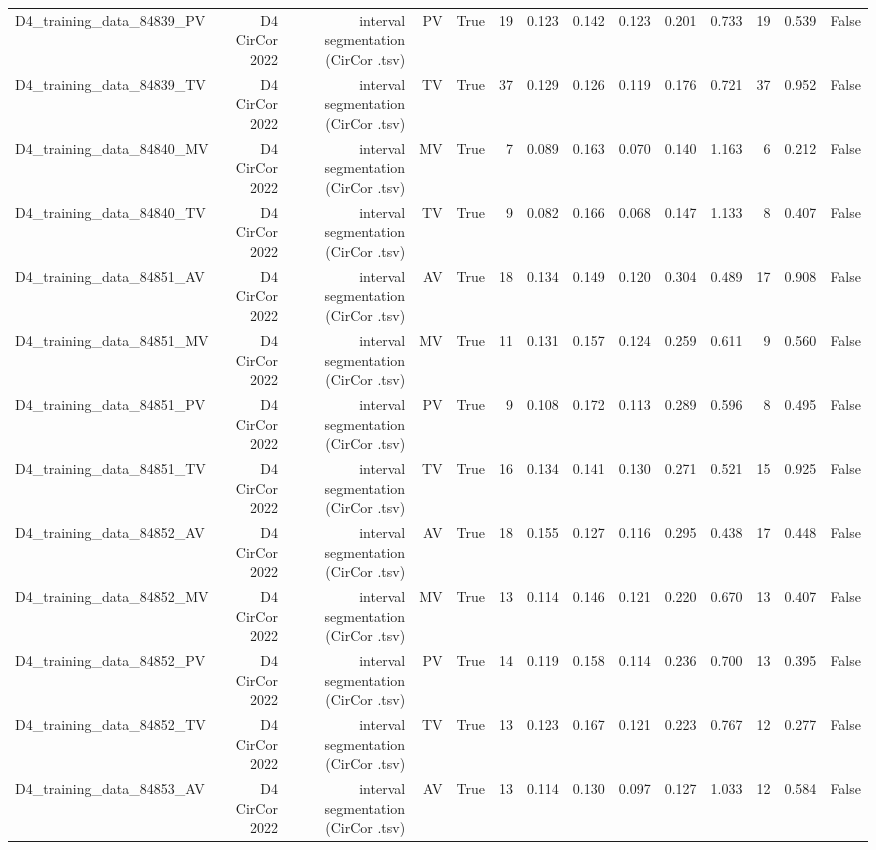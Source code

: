 \begin{table}[htbp]
\begin{tabular}{lrrrrrrrrrrrrr}
    D4\_training\_data\_84839\_PV & D4 CirCor 2022 & interval segmentation (CirCor .tsv) & PV & True & 19 & 0.123 & 0.142 & 0.123 & 0.201 & 0.733 & 19 & 0.539 & False \\
    D4\_training\_data\_84839\_TV & D4 CirCor 2022 & interval segmentation (CirCor .tsv) & TV & True & 37 & 0.129 & 0.126 & 0.119 & 0.176 & 0.721 & 37 & 0.952 & False \\
    D4\_training\_data\_84840\_MV & D4 CirCor 2022 & interval segmentation (CirCor .tsv) & MV & True & 7 & 0.089 & 0.163 & 0.070 & 0.140 & 1.163 & 6 & 0.212 & False \\
    D4\_training\_data\_84840\_TV & D4 CirCor 2022 & interval segmentation (CirCor .tsv) & TV & True & 9 & 0.082 & 0.166 & 0.068 & 0.147 & 1.133 & 8 & 0.407 & False \\
    D4\_training\_data\_84851\_AV & D4 CirCor 2022 & interval segmentation (CirCor .tsv) & AV & True & 18 & 0.134 & 0.149 & 0.120 & 0.304 & 0.489 & 17 & 0.908 & False \\
    D4\_training\_data\_84851\_MV & D4 CirCor 2022 & interval segmentation (CirCor .tsv) & MV & True & 11 & 0.131 & 0.157 & 0.124 & 0.259 & 0.611 & 9 & 0.560 & False \\
    D4\_training\_data\_84851\_PV & D4 CirCor 2022 & interval segmentation (CirCor .tsv) & PV & True & 9 & 0.108 & 0.172 & 0.113 & 0.289 & 0.596 & 8 & 0.495 & False \\
    D4\_training\_data\_84851\_TV & D4 CirCor 2022 & interval segmentation (CirCor .tsv) & TV & True & 16 & 0.134 & 0.141 & 0.130 & 0.271 & 0.521 & 15 & 0.925 & False \\
    D4\_training\_data\_84852\_AV & D4 CirCor 2022 & interval segmentation (CirCor .tsv) & AV & True & 18 & 0.155 & 0.127 & 0.116 & 0.295 & 0.438 & 17 & 0.448 & False \\
    D4\_training\_data\_84852\_MV & D4 CirCor 2022 & interval segmentation (CirCor .tsv) & MV & True & 13 & 0.114 & 0.146 & 0.121 & 0.220 & 0.670 & 13 & 0.407 & False \\
    D4\_training\_data\_84852\_PV & D4 CirCor 2022 & interval segmentation (CirCor .tsv) & PV & True & 14 & 0.119 & 0.158 & 0.114 & 0.236 & 0.700 & 13 & 0.395 & False \\
    D4\_training\_data\_84852\_TV & D4 CirCor 2022 & interval segmentation (CirCor .tsv) & TV & True & 13 & 0.123 & 0.167 & 0.121 & 0.223 & 0.767 & 12 & 0.277 & False \\
    D4\_training\_data\_84853\_AV & D4 CirCor 2022 & interval segmentation (CirCor .tsv) & AV & True & 13 & 0.114 & 0.130 & 0.097 & 0.127 & 1.033 & 12 & 0.584 & False \\

\end{tabular}
\end{table}

